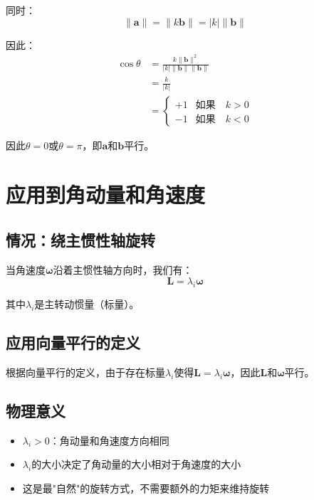 \documentclass[12pt,a4paper]{article}
\begin{document}
同时：
\begin{equation}
\|\bm{a}\| = \|k \bm{b}\| = |k| \|\bm{b}\|
\end{equation}

因此：
\begin{align}
\cos\theta &= \frac{k \|\bm{b}\|^2}{|k| \|\bm{b}\| \|\bm{b}\|} \\
&= \frac{k}{|k|} \\
&= \begin{cases}
+1 & \text{如果} \quad k > 0 \\
-1 & \text{如果} \quad k < 0
\end{cases}
\end{align}

因此$\theta = 0$或$\theta = \pi$，即$\bm{a}$和$\bm{b}$平行。

\section{应用到角动量和角速度}

\subsection{情况：绕主惯性轴旋转}

当角速度$\bm{\omega}$沿着主惯性轴方向时，我们有：
\begin{equation}
\bm{L} = \lambda_i \bm{\omega}
\end{equation}

其中$\lambda_i$是主转动惯量（标量）。

\subsection{应用向量平行的定义}

根据向量平行的定义，由于存在标量$\lambda_i$使得$\bm{L} = \lambda_i \bm{\omega}$，因此$\bm{L}$和$\bm{\omega}$平行。

\subsection{物理意义}

\begin{itemize}
\item $\lambda_i > 0$：角动量和角速度方向相同
\item $\lambda_i$的大小决定了角动量的大小相对于角速度的大小
\item 这是最"自然"的旋转方式，不需要额外的力矩来维持旋转
\end{itemize}
\end{document}

